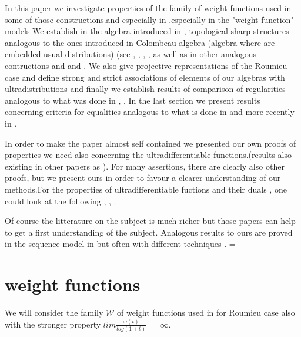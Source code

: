 \documentclass[12pt,a4paper]{amsart}
\begin{document}
     In this paper we investigate properties of the family of weight functions used in some of those  constructions.and especially in \cite{D.V.V.}.especially in the "weight function" models
      We establish in the algebra introduced in \cite{D.V.V.}, topological sharp structures analogous to the ones introduced in Colombeau algebra (algebra where are embedded usual distributions) (see \cite{S.1}, \cite{S.2}, \cite{S.3},\cite{S.4} \cite{G.1}, \cite{G.2} as well as in other analogous contructions \cite{D.S.1} and \cite{D.S.2} and \cite{P.R.S.Z}.
    We also  give projective representations of the Roumieu case and define strong and strict associations of elements of our algebras with ultradistributions and finally we establish results of comparison of regularities analogous to what was done in \cite{S.1}, \cite{P.S.V.} ,\cite{P.R.S.Z}
    In the last section we present results concerning criteria for equalities analogous to what is done in  \cite{P.S.V.} and
    more recently in \cite{P.R.S.Z}.
    
     In order to make the paper almost self contained we presented our own proofs of properties we need also concerning the ultradifferentiable functions.(results also existing in other papers as \cite{D.P.V.}). 
      For many assertions, there are clearly also other proofs, but we present ours in order to favour  a clearer understanding of our methods.For the properties of ultradifferentiable fuctions and their duals , one could louk at the following \cite{B.M.T.}, \cite{R.S.}, \cite{N.V.}.
     
      Of course the litterature on the subject is much richer 
      but those papers can help to get a first  understanding of the subject. 
      Analogous results to ours are proved in the sequence model 
      in \cite{P.R.S.Z}
     but often  with different techniques .                             =
\section{weight functions}

We will consider the family $\mathcal{W}$ of weight functions used in \cite{D.V.V.} for Roumieu case also
with the stronger property
 $ lim \frac{\omega(t)}{log(1+t)}\,=\,\infty .$
\end{document}
